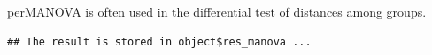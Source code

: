 \documentclass[
]{book}
\newenvironment{Shaded}{\begin{snugshade}}{\end{snugshade}}
\newcommand{\AttributeTok}[1]{\textcolor[rgb]{0.77,0.63,0.00}{#1}}
\newcommand{\CommentTok}[1]{\textcolor[rgb]{0.56,0.35,0.01}{\textit{#1}}}
\newcommand{\ConstantTok}[1]{\textcolor[rgb]{0.00,0.00,0.00}{#1}}
\newcommand{\FunctionTok}[1]{\textcolor[rgb]{0.00,0.00,0.00}{#1}}
\newcommand{\NormalTok}[1]{#1}
\newcommand{\SpecialCharTok}[1]{\textcolor[rgb]{0.00,0.00,0.00}{#1}}
\begin{document}
perMANOVA\citep{Anderson_Austral_2001} is often used in the differential test of distances among groups.

\begin{Shaded}
\end{Shaded}

\begin{verbatim}
## The result is stored in object$res_manova ...
\end{verbatim}
\end{document}
